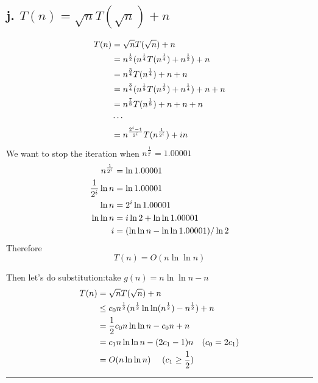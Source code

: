 \documentclass[oneside]{homework} %
\begin{document}
\subsection*{j. $T(n)=\sqrt{n} T(\sqrt {n})+ n $}
\begin{equation}
\notag
\begin{aligned}[b]
T(n) &= \sqrt{n} T(\sqrt {n})+ n \\
&= n^{\frac{1}{2}}(n^{\frac{1}{4}}T(n^{\frac{1}{4}}) +n^{\frac{1}{2}}) + n\\
&= n^{\frac{3}{4}}T(n^{\frac{1}{4}}) + n+n\\
&= n^{\frac{3}{4}}(n^{\frac{1}{8}}T(n^{\frac{1}{8}}) +n^{\frac{1}{4}}) + n+n\\
&= n^{\frac{7}{8}}T(n^{\frac{1}{8}})+n+n+n\\
& \cdots \\
&= n^{\frac{2^{i}-1}{2^{i}}}T(n^{\frac{1}{2^{i}}})+in\\
\end{aligned}
\end{equation}
We want to stop the iteration when $n^{\frac{1}{2^i}} = 1.00001 $
\begin{equation}
\notag
\begin{aligned}[b]
n^{\frac{1}{2^i}} &= \ln 1.00001  \\
\frac{1}{2^i} \ln n &= \ln 1.00001 \\
 \ln n &= 2^i \ln 1.00001  \\
 \ln \ln n &= i \ln 2 +\ln\ln 1.00001 \\
 i &= (\ln \ln n - \ln \ln 1.00001) / \ln 2 \\
\end{aligned}
\end{equation}
Therefore $$T(n) = O(n \ln \ln n)$$


Then let's do substitution:take $g(n)= n\ln\ln n -n $
\begin{equation}
\notag
\begin{aligned}[b]
T(n) &= \sqrt{n} T(\sqrt {n})+ n \\
&\leq c_{0}n^{\frac{1}{2}} (n^{\frac{1}{2}} \ln \ln (n^{\frac{1}{2}}) - n^{\frac{1}{2}}) +n \\
&= \frac{1}{2} c_{0}n \ln \ln n - c_{0}n +n \\
&= c_{1}n \ln \ln n - (2c_{1}-1)n ~~~({c_{0}=2c_{1}})\\
&= O(n \ln\ln n) ~~~~ (c_{1} \geq \frac{1}{2})\\
\end{aligned}
\end{equation}
\rule{3mm}{3mm}
\end{document}

